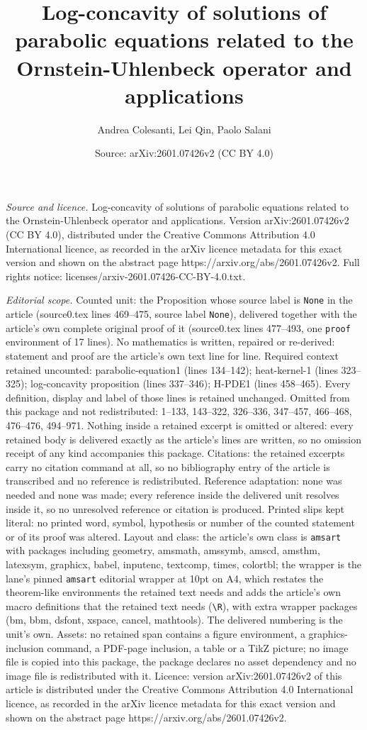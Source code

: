 \documentclass[10pt,a4paper]{amsart}
\title[Log-concavity of solutions of parabolic equations related to]{Log-concavity of solutions of parabolic equations related to the Ornstein-Uhlenbeck operator and applications}
\author{Andrea Colesanti, Lei Qin, Paolo Salani}
\date{Source: arXiv:2601.07426v2 (CC BY 4.0)}
\begin{document}
\maketitle

\noindent\emph{Source and licence.} Log-concavity of solutions of parabolic equations related to the Ornstein-Uhlenbeck operator and applications. Version arXiv:2601.07426v2 (CC BY 4.0), distributed under the Creative Commons Attribution 4.0 International licence, as recorded in the arXiv licence metadata for this exact version and shown on the abstract page https://arxiv.org/abs/2601.07426v2. Full rights notice: licenses/arxiv-2601.07426-CC-BY-4.0.txt.\par\smallskip

\noindent\textit{Editorial scope.} Counted unit: the Proposition whose source label is \texttt{None} in the article (source0.tex lines 469--475, source label \texttt{None}), delivered together with the article's own complete original proof of it (source0.tex lines 477--493, one \texttt{proof} environment of 17 lines). No mathematics is written, repaired or re-derived: statement and proof are the article's own text line for line. Required context retained uncounted: parabolic-equation1 (lines 134--142); heat-kernel-1 (lines 323--325); log-concavity proposition (lines 337--346); H-PDE1 (lines 458--465). Every definition, display and label of those lines is retained unchanged. Omitted from this package and not redistributed: 1--133, 143--322, 326--336, 347--457, 466--468, 476--476, 494--971. Nothing inside a retained excerpt is omitted or altered: every retained body is delivered exactly as the article's lines are written, so no omission receipt of any kind accompanies this package. Citations: the retained excerpts carry no citation command at all, so no bibliography entry of the article is transcribed and no reference is redistributed. Reference adaptation: none was needed and none was made; every reference inside the delivered unit resolves inside it, so no unresolved reference or citation is produced. Printed slips kept literal: no printed word, symbol, hypothesis or number of the counted statement or of its proof was altered. Layout and class: the article's own class is \texttt{amsart} with packages including geometry, amsmath, amssymb, amscd, amsthm, latexsym, graphicx, babel, inputenc, textcomp, times, colortbl; the wrapper is the lane's pinned \texttt{amsart} editorial wrapper at 10pt on A4, which restates the theorem-like environments the retained text needs and adds the article's own macro definitions that the retained text needs (\texttt{\textbackslash R}), with extra wrapper packages (bm, bbm, dsfont, xspace, cancel, mathtools). The delivered numbering is the unit's own. Assets: no retained span contains a figure environment, a graphics-inclusion command, a PDF-page inclusion, a table or a TikZ picture; no image file is copied into this package, the package declares no asset dependency and no image file is redistributed with it. Licence: version arXiv:2601.07426v2 of this article is distributed under the Creative Commons Attribution 4.0 International licence, as recorded in the arXiv licence metadata for this exact version and shown on the abstract page https://arxiv.org/abs/2601.07426v2. 
\end{document}
